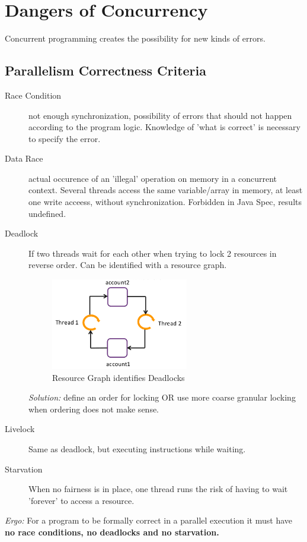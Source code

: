 \section{Dangers of Concurrency}

Concurrent programming creates the possibility for new kinds of errors.

\subsection{Parallelism Correctness Criteria}

\begin{description}
  \item[Race Condition] not enough synchronization, possibility of errors that should not happen according to the program logic. Knowledge of 'what is correct' is necessary to specify the error.
  \item[Data Race] actual occurence of an 'illegal' operation on memory in a concurrent context. Several threads access the same variable/array in memory, at least one write acceess, without synchronization. Forbidden in Java Spec, results undefined.
  \item[Deadlock] If two threads wait for each other when trying to lock 2 resources in reverse order. Can be identified with a resource graph. 
  \begin{figure}
    \centering
    \includegraphics[width=6cm]{res/04-resource-graph.png}
    \caption{Resource Graph identifies Deadlocks}
  \end{figure}
  \textit{Solution:} define an order for locking OR use more coarse granular locking when ordering does not make sense.
  \item[Livelock] Same as deadlock, but executing instructions while waiting. 
  \item[Starvation] When no fairness is in place, one thread runs the risk of having to wait 'forever' to access a resource.
\end{description}

\noindent
\textit{Ergo:} For a program to be formally correct in a parallel execution it must have \textbf{no race conditions, no deadlocks and no starvation.}

